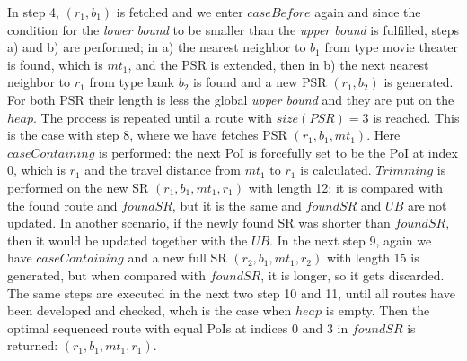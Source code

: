 In step 4, $(r_1, b_1)$ is fetched and we enter $caseBefore$ again and since the condition for the \textit{lower bound} to be smaller than the \textit{upper bound} is fulfilled, steps a) and b) are performed; in a) the nearest neighbor to $b_1$ from type movie theater is found, which is $mt_1$, and the PSR is extended, then in b) the next nearest neighbor to $r_1$ from type bank $b_2$ is found and a new PSR $(r_1, b_2)$ is generated. For both PSR their length is less the global \textit{upper bound} and they are put on the $heap$. The process is repeated until a route with $size(PSR) = 3$ is reached. This is the case with step 8, where we have fetches PSR $(r_1, b_1, mt_1)$. Here $caseContaining$ is performed: the next PoI is forcefully set to be the PoI at index 0, which is $r_1$ and the travel distance from $mt_1$ to $r_1$ is calculated. $Trimming$ is performed on the new SR $(r_1, b_1, mt_1, r_1)$ with length 12: it is compared with the found route and $foundSR$, but it is the same and $foundSR$ and $UB$ are not updated. In another scenario, if the newly found SR was shorter than $foundSR$, then it would be updated together with the $UB$.\newline 
In the next step 9, again we have $caseContaining$ and a new full SR $(r_2, b_1, mt_1, r_2)$ with length 15 is generated, but when compared with $foundSR$, it is longer, so it gets discarded. The same steps are executed in the next two step 10 and 11, until all routes have been developed and checked, whch is the case when $heap$ is empty. Then the optimal sequenced route with equal PoIs at indices 0 and 3 in $foundSR$ is returned: $(r_1, b_1, mt_1, r_1)$.

